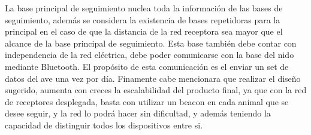 La base principal de seguimiento nuclea toda la información de las bases de seguimiento, además se considera la existencia de bases repetidoras para la principal en el caso de que la distancia de la red receptora sea mayor que el alcance de la base principal de seguimiento.
Esta base también debe contar con independencia de la red eléctrica, debe poder comunicarse con la base del nido mediante Bluetooth. El propósito de esta comunicación es el enviar un set de datos del ave una vez por día.
Finamente cabe mencionara que realizar el diseño sugerido, aumenta con creces la escalabilidad del producto final, ya que con la red de receptores desplegada, basta con utilizar un beacon en cada animal que se desee seguir, y la red lo podrá hacer sin dificultad, y además teniendo la capacidad de distinguir todos los dispositivos entre si.
